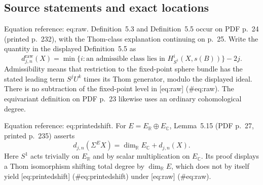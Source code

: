 \documentclass[10pt]{article}
\begin{document}
\subsection*{Source statements and exact locations}
Equation reference: eq:raw. Definition 5.3 and Definition 5.5 occur on PDF p. 24 (printed p. 232), with the Thom-class explanation continuing on p. 25. Write the quantity in the displayed Definition 5.5 as \[
 d^{\mathrm{raw}}_{j,n}(X)
 =\min\{i:\text{an admissible class lies in }H^i_{S^1}(X,s(B))\}-2j .\] Admissibility means that restriction to the fixed-point sphere bundle has the stated leading term \(S^jU^k\) times its Thom generator, modulo the displayed ideal. There is no subtraction of the fixed-point level in [eq:raw] (\#eq:raw). The equivariant definition on PDF p. 23 likewise uses an ordinary cohomological degree.\par
Equation reference: eq:printedshift. For \(E=E_{\mathbb R}\oplus E_{\mathbb C}\), Lemma 5.15 (PDF p. 27, printed p. 235) asserts \[
 d_{j,n}(\Sigma^E X)
 =\dim_{\mathbb R}E_{\mathbb C}+d_{j,n}(X).\] Here \(S^1\) acts trivially on \(E_{\mathbb R}\) and by scalar multiplication on \(E_{\mathbb C}\). Its proof displays a Thom isomorphism shifting total degree by \(\dim_{\mathbb R}E\), which does not by itself yield [eq:printedshift] (\#eq:printedshift) under [eq:raw] (\#eq:raw).\par
\end{document}
